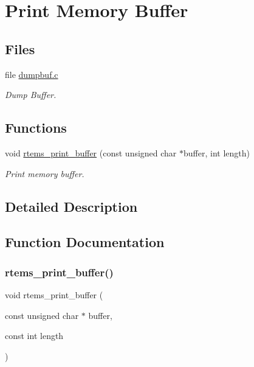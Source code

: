 \hypertarget{group__libmisc__dumpbuf}{}\section{Print Memory Buffer}
\label{group__libmisc__dumpbuf}
\subsection*{Files}
\begin{DoxyCompactItemize}
\item 
file \mbox{\hyperlink{dumpbuf_8c}{dumpbuf.\+c}}
\begin{DoxyCompactList}\small\item\em Dump Buffer. \end{DoxyCompactList}\end{DoxyCompactItemize}
\subsection*{Functions}
\begin{DoxyCompactItemize}
\item 
void \mbox{\hyperlink{group__libmisc__dumpbuf_ga8998e675a85eea502d40900ffceb5dbb}{rtems\+\_\+print\+\_\+buffer}} (const unsigned char $\ast$buffer, int length)
\begin{DoxyCompactList}\small\item\em Print memory buffer. \end{DoxyCompactList}\end{DoxyCompactItemize}


\subsection{Detailed Description}


\subsection{Function Documentation}
\mbox{\label{group__libmisc__dumpbuf_ga8998e675a85eea502d40900ffceb5dbb}} 
\subsubsection{\texorpdfstring{rtems\_print\_buffer()}{rtems\_print\_buffer()}}
{\footnotesize\ttfamily void rtems\+\_\+print\+\_\+buffer (\begin{DoxyParamCaption}\item[{const unsigned char $\ast$}]{buffer,  }\item[{const int}]{length }\end{DoxyParamCaption})}



